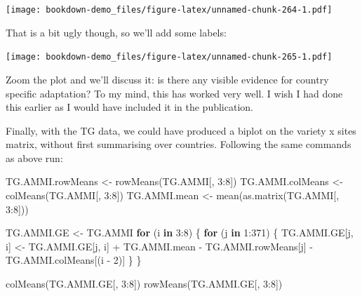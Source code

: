 \documentclass[
]{book}
\newenvironment{Shaded}{\begin{snugshade}}{\end{snugshade}}
\newcommand{\AttributeTok}[1]{\textcolor[rgb]{0.77,0.63,0.00}{#1}}
\newcommand{\ControlFlowTok}[1]{\textcolor[rgb]{0.13,0.29,0.53}{\textbf{#1}}}
\newcommand{\DecValTok}[1]{\textcolor[rgb]{0.00,0.00,0.81}{#1}}
\newcommand{\FloatTok}[1]{\textcolor[rgb]{0.00,0.00,0.81}{#1}}
\newcommand{\FunctionTok}[1]{\textcolor[rgb]{0.00,0.00,0.00}{#1}}
\newcommand{\NormalTok}[1]{#1}
\newcommand{\OtherTok}[1]{\textcolor[rgb]{0.56,0.35,0.01}{#1}}
\newcommand{\SpecialCharTok}[1]{\textcolor[rgb]{0.00,0.00,0.00}{#1}}
\newcommand{\StringTok}[1]{\textcolor[rgb]{0.31,0.60,0.02}{#1}}
\begin{document}
\texttt{[image: bookdown-demo\_files/figure-latex/unnamed-chunk-264-1.pdf]}

That is a bit ugly though, so we'll add some labels:

\begin{Shaded}
\end{Shaded}

\texttt{[image: bookdown-demo\_files/figure-latex/unnamed-chunk-265-1.pdf]}

Zoom the plot and we'll discuss it: is there any visible evidence for country specific adaptation? To my mind, this has worked very well. I wish I had done this earlier as I would have included it in the publication.

Finally, with the TG data, we could have produced a biplot on the variety x sites matrix, without first summarising over countries. Following the same commands as above run:

\begin{Shaded}
\begin{Highlighting}[]
\NormalTok{TG.AMMI.rowMeans }\OtherTok{\textless{}{-}} \FunctionTok{rowMeans}\NormalTok{(TG.AMMI[, }\DecValTok{3}\SpecialCharTok{:}\DecValTok{8}\NormalTok{])}
\NormalTok{TG.AMMI.colMeans }\OtherTok{\textless{}{-}} \FunctionTok{colMeans}\NormalTok{(TG.AMMI[, }\DecValTok{3}\SpecialCharTok{:}\DecValTok{8}\NormalTok{])}
\NormalTok{TG.AMMI.mean }\OtherTok{\textless{}{-}} \FunctionTok{mean}\NormalTok{(}\FunctionTok{as.matrix}\NormalTok{(TG.AMMI[, }\DecValTok{3}\SpecialCharTok{:}\DecValTok{8}\NormalTok{]))}

\NormalTok{TG.AMMI.GE }\OtherTok{\textless{}{-}}\NormalTok{ TG.AMMI}
\ControlFlowTok{for}\NormalTok{ (i }\ControlFlowTok{in} \DecValTok{3}\SpecialCharTok{:}\DecValTok{8}\NormalTok{) \{}
    \ControlFlowTok{for}\NormalTok{ (j }\ControlFlowTok{in} \DecValTok{1}\SpecialCharTok{:}\DecValTok{371}\NormalTok{) \{}
\NormalTok{        TG.AMMI.GE[j, i] }\OtherTok{\textless{}{-}}\NormalTok{ TG.AMMI.GE[j, i] }\SpecialCharTok{+}\NormalTok{ TG.AMMI.mean }\SpecialCharTok{{-}} 
\NormalTok{            TG.AMMI.rowMeans[j] }\SpecialCharTok{{-}}\NormalTok{ TG.AMMI.colMeans[(i }\SpecialCharTok{{-}} \DecValTok{2}\NormalTok{)]}
\NormalTok{    \}}
\NormalTok{\}}

\FunctionTok{colMeans}\NormalTok{(TG.AMMI.GE[, }\DecValTok{3}\SpecialCharTok{:}\DecValTok{8}\NormalTok{])}
\FunctionTok{rowMeans}\NormalTok{(TG.AMMI.GE[, }\DecValTok{3}\SpecialCharTok{:}\DecValTok{8}\NormalTok{])}
\end{Highlighting}
\end{Shaded}
\end{document}
